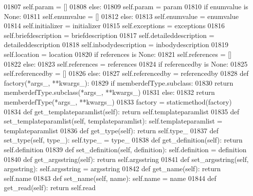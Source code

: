 \begin{DoxyCode}
{{{{{{{{{{{{{{{{{{{{{{{{{{{{{{{{{{{{{{{{{{{{{{{{{{{{{{{{{{{{{{{{{{{{{{{{{{{{{{{{{{{{{{{{{{{{{{{{{{{{{{{{{{{{{{{{{{01807             self.param = []
01808         \textcolor{keywordflow}{else}:
01809             self.param = param
01810         \textcolor{keywordflow}{if} enumvalue \textcolor{keywordflow}{is} \textcolor{keywordtype}{None}:
01811             self.enumvalue = []
01812         \textcolor{keywordflow}{else}:
01813             self.enumvalue = enumvalue
01814         self.initializer = initializer
01815         self.exceptions = exceptions
01816         self.briefdescription = briefdescription
01817         self.detaileddescription = detaileddescription
01818         self.inbodydescription = inbodydescription
01819         self.location = location
01820         \textcolor{keywordflow}{if} references \textcolor{keywordflow}{is} \textcolor{keywordtype}{None}:
01821             self.references = []
01822         \textcolor{keywordflow}{else}:
01823             self.references = references
01824         \textcolor{keywordflow}{if} referencedby \textcolor{keywordflow}{is} \textcolor{keywordtype}{None}:
01825             self.referencedby = []
01826         \textcolor{keywordflow}{else}:
01827             self.referencedby = referencedby
01828     \textcolor{keyword}{def }factory(*args\_, **kwargs\_):
01829         \textcolor{keywordflow}{if} memberdefType.subclass:
01830             \textcolor{keywordflow}{return} memberdefType.subclass(*args\_, **kwargs\_)
01831         \textcolor{keywordflow}{else}:
01832             \textcolor{keywordflow}{return} memberdefType(*args\_, **kwargs\_)
01833     factory = staticmethod(factory)
01834     \textcolor{keyword}{def }get_templateparamlist(self): \textcolor{keywordflow}{return} self.templateparamlist
01835     \textcolor{keyword}{def }set_templateparamlist(self, templateparamlist): self.templateparamlist = templateparamlist
01836     \textcolor{keyword}{def }get_type(self): \textcolor{keywordflow}{return} self.type\_
01837     \textcolor{keyword}{def }set_type(self, type\_): self.type\_ = type\_
01838     \textcolor{keyword}{def }get_definition(self): \textcolor{keywordflow}{return} self.definition
01839     \textcolor{keyword}{def }set_definition(self, definition): self.definition = definition
01840     \textcolor{keyword}{def }get_argsstring(self): \textcolor{keywordflow}{return} self.argsstring
01841     \textcolor{keyword}{def }set_argsstring(self, argsstring): self.argsstring = argsstring
01842     \textcolor{keyword}{def }get_name(self): \textcolor{keywordflow}{return} self.name
01843     \textcolor{keyword}{def }set_name(self, name): self.name = name
01844     \textcolor{keyword}{def }get_read(self): \textcolor{keywordflow}{return} self.read
}}}}}}}}}}}}}}}}}}}}}}}}}}}}}}}}}}}}}}}}}}}}}}}}}}}}}}}}}}}}}}}}}}}}}}}}}}}}}}}}}}}}}}}}}}}}}}}}}}}}}}}}}}}}}}}}}}
\end{DoxyCode}
